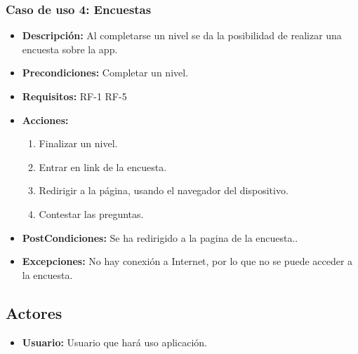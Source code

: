 \subsubsection{Caso de uso 4: Encuestas}
\begin{itemize}
	\item \textbf{Descripción:}  Al completarse un nivel se da la posibilidad de realizar una encuesta sobre la app.
	\item \textbf{Precondiciones:} Completar un nivel.
	\item \textbf{Requisitos:} RF-1 RF-5
	\item \textbf{Acciones:}
	\begin{enumerate}
		\item Finalizar un nivel.
		\item Entrar en link de la encuesta.
		\item Redirigir a la página, usando el navegador del dispositivo.
		\item Contestar las preguntas.
	\end{enumerate}
	\item \textbf{PostCondiciones:} Se ha redirigido a la pagina de la encuesta..
	\item \textbf{Excepciones:} No hay conexión a Internet, por lo que no se puede acceder a la encuesta.
	
\end{itemize}

\subsection{Actores}
\begin{itemize}
	\item \textbf{Usuario:} Usuario que hará uso aplicación.
\end{itemize}


